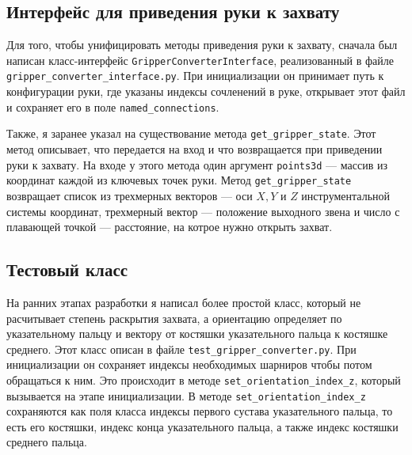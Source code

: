 \documentclass[12pt, a4paper]{article}
\begin{document}
\subsection{Интерфейс для приведения руки к захвату}
Для того, чтобы унифицировать методы приведения руки к захвату, сначала был
написан класс-интерфейс \texttt{GripperConverterInterface}, реализованный в
файле \texttt{gripper\_converter\_interface.py}.
При инициализации он принимает путь к конфигурации руки, где указаны индексы
сочленений в руке, открывает этот файл и сохраняет его в поле \texttt{named\_connections}.

Также, я заранее указал на существование метода \texttt{get\_gripper\_state}.
Этот метод описывает, что передается на вход и что возвращается при
приведении руки к захвату.
На входе у этого метода один аргумент \texttt{points3d} --- массив из
координат каждой из ключевых точек руки.
Метод \texttt{get\_gripper\_state} возвращает список из трехмерных векторов
--- оси $X, Y$ и $Z$ инструментальной системы координат, трехмерный вектор
--- положение выходного звена и число с плавающей точкой --- расстояние, на
котрое нужно открыть захват.

\subsection{Тестовый класс}
На ранних этапах разработки я написал более простой класс, который не
расчитывает степень раскрытия захвата, а ориентацию определяет по
указательному пальцу и вектору от костяшки указательного пальца к костяшке
среднего. Этот класс описан в файле \texttt{test\_gripper\_converter.py}.
При инициализации он сохраняет индексы необходимых шарниров чтобы потом
обращаться к ним. Это происходит в методе
\texttt{set\_orientation\_index\_z}, который вызывается на этапе
инициализации.
В методе \texttt{set\_orientation\_index\_z} сохраняются как поля класса индексы первого
сустава указательного пальца, то есть его костяшки, индекс конца
указательного пальца, а также индекс костяшки среднего пальца.
\end{document}
